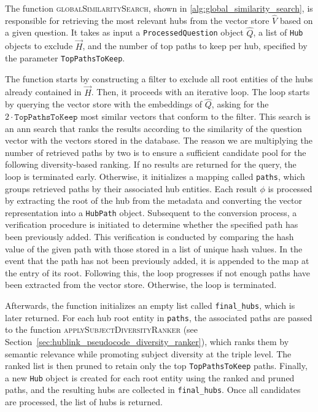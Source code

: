 The function \textsc{globalSimilaritySearch}, shown in \autoref{alg:global_similarity_search}, is responsible for retrieving the most relevant hubs from the vector store \(\hat{V}\) based on a given question. It takes as input a \texttt{ProcessedQuestion} object \(\hat{Q}\), a list of \texttt{Hub} objects to exclude \(\vec{H}\), and the number of top paths to keep per hub, specified by the parameter \texttt{TopPathsToKeep}.

The function starts by constructing a filter to exclude all root entities of the hubs already contained in \(\vec{H}\). Then, it proceeds with an iterative loop. The loop starts by querying the vector store with the embeddings of \(\hat{Q}\), asking for the \(2 \cdot \texttt{TopPathsToKeep}\) most similar vectors that conform to the filter. This search is an \gls{ann} search that ranks the results according to the similarity of the question vector with the vectors stored in the database. The reason we are multiplying the number of retrieved paths by two is to ensure a sufficient candidate pool for the following diversity-based ranking. If no results are returned for the query, the loop is terminated early. Otherwise, it initializes a mapping called \texttt{paths}, which groups retrieved paths by their associated hub entities. Each result \(\phi\) is processed by extracting the root of the hub from the metadata and converting the vector representation into a \texttt{HubPath} object. Subsequent to the conversion process, a verification procedure is initiated to determine whether the specified path has been previously added. This verification is conducted by comparing the hash value of the given path with those stored in a list of unique hash values. In the event that the path has not been previously added, it is appended to the map at the entry of its root. Following this, the loop progresses if not enough paths have been extracted from the vector store. Otherwise, the loop is terminated.

Afterwards, the function initializes an empty list called \texttt{final\_hubs}, which is later returned. For each hub root entity in \texttt{paths}, the associated paths are passed to the function \textsc{applySubjectDiversityRanker} (see Section~\ref{sec:hublink_pseudocode_diversity_ranker}), which ranks them by semantic relevance while promoting subject diversity at the triple level. The ranked list is then pruned to retain only the top \texttt{TopPathsToKeep} paths. Finally, a new \texttt{Hub} object is created for each root entity using the ranked and pruned paths, and the resulting hubs are collected in \texttt{final\_hubs}. Once all candidates are processed, the list of hubs is returned.


